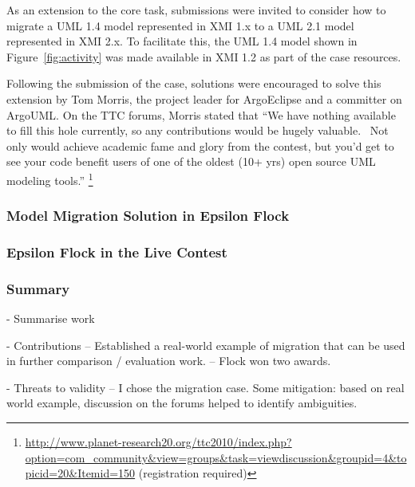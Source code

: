 As an extension to the core task, submissions were invited to consider how to migrate a UML 1.4 model represented in XMI 1.x to a UML 2.1 model represented in XMI 2.x. To facilitate this, the UML 1.4 model shown in Figure~\ref{fig:activity} was made available in XMI 1.2 as part of the case resources.

Following the submission of the case, solutions were encouraged to solve this extension by Tom Morris, the project leader for ArgoEclipse and a committer on ArgoUML. On the TTC forums, Morris stated that ``We have nothing available to fill this hole currently, so any contributions would be hugely valuable.  Not only would achieve academic fame and glory from the contest, but you'd get to see your code benefit users of one of the oldest (10+ yrs) open source UML modeling tools.'' \footnote{\url{http://www.planet-research20.org/ttc2010/index.php?option=com_community&view=groups&task=viewdiscussion&groupid=4&topicid=20&Itemid=150} (registration required)}

\subsubsection{Model Migration Solution in Epsilon Flock}
\label{subsubsec:ttc_solution}

\subsubsection{Epsilon Flock in the Live Contest}
\label{subsubsec:ttc_live_contest}


\subsubsection{Summary}
- Summarise work

- Contributions
-- Established a real-world example of migration that can be used in further comparison / evaluation work.
-- Flock won two awards.

- Threats to validity
-- I chose the migration case. Some mitigation: based on real world example, discussion on the forums helped to identify ambiguities. 

